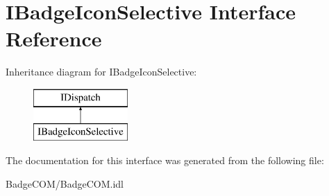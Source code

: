 \hypertarget{interface_i_badge_icon_selective}{\section{I\-Badge\-Icon\-Selective Interface Reference}
\label{interface_i_badge_icon_selective}
}
Inheritance diagram for I\-Badge\-Icon\-Selective\-:\begin{figure}[H]
\begin{center}
\leavevmode
\includegraphics[height=2.000000cm]{interface_i_badge_icon_selective}
\end{center}
\end{figure}


The documentation for this interface was generated from the following file\-:\begin{DoxyCompactItemize}
\item 
Badge\-C\-O\-M/Badge\-C\-O\-M.\-idl\end{DoxyCompactItemize}
